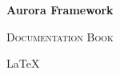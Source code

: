 \begin{titlepage}
	\centering
	\vspace*{\fill}
	{\huge\bfseries Aurora Framework\par}
	\vspace{1cm}
	{\scshape\Large Documentation Book\par}
	\vfill
	\LARGE\LaTeX
\end{titlepage}